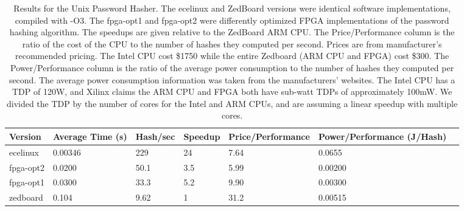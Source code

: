 \begin{table}[h]
\centering
\begin{tabular}{@{}lllllll@{}}
\toprule
  Version   & Average Time (s) & Hash/sec & Speedup & Price/Performance & Power/Performance (J/Hash) \\ \midrule
  ecelinux  & 0.00346          & 229      & 24      & 7.64  & 0.0655                        \\
  fpga-opt2 & 0.0200           & 50.1     & 3.5     & 5.99  & 0.00200                       \\
  fpga-opt1 & 0.0300           & 33.3     & 5.2     & 9.90  & 0.00300                       \\
  zedboard  & 0.104            & 9.62     & 1       & 31.2  & 0.00515                       \\ \bottomrule
\end{tabular}
\caption {Results for the Unix Password Hasher. The ecelinux and ZedBoard versions were identical software
  implementations, compiled with -O3. The fpga-opt1 and fpga-opt2 were differently optimized FPGA
  implementations of the password hashing algorithm. The speedups are given relative to the ZedBoard ARM
  CPU. The Price/Performance column is the ratio of the cost of the CPU to the number of hashes they computed
  per second. Prices are from manufacturer's recommended pricing. The Intel CPU cost \$1750 while the
  entire Zedboard (ARM CPU and FPGA) cost \$300. The Power/Performance column is the ratio of the average
  power consumption to the number of hashes they computed per second. The average power consumption
  information was taken from the manufacturers' websites. The Intel CPU has a TDP of 120W, and Xilinx 
  claims the ARM CPU and FPGA both have sub-watt TDPs of approximately 100mW. We divided the TDP by the
  number of cores for the Intel and ARM CPUs, and are assuming a linear speedup with multiple cores.}
\label{table:hashresults}
\end{table}

